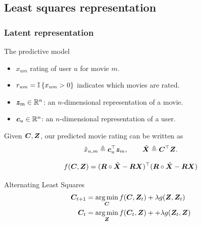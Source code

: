 \subsection{Least squares representation}
\begin{frame}
  \frametitle{Latent representation}
  \begin{block}{The predictive model}
    \begin{itemize}
    \item $x_{um}$ rating of user $u$ for movie $m$.
    \item $r_{um} = \mathop{\mbox{\ensuremath{\mathbb{I}}}}\left\{x_{um} > 0\right\}$ indicates which movies are rated.
    \item $\bz_{m} \in \Reals^n$: an $n$-dimensional representation of a movie.
    \item $\bc_{u} \in \Reals^n$: an $n$-dimensional representation of a user.
    \end{itemize}

    Given $\MC, \MZ$, our predicted movie rating can be written as
    \[
    \hat{x}_{u,m} \defn \bc_u^\top \bz_m, \qquad \hat{\MX} \defn \MC^\top \MZ.
    \]
  \end{block}
\[
f(\MC, \MZ) = (\MR \circ \hat{\MX} - \MR \MX)^\top (\MR \circ \hat{\MX} - \MR \MX)
\]
\begin{block}{Alternating Least Squares}
  \begin{align}
    \label{eq:als}
    \MC_{t+1} &= \argmin_{\MC} f(\MC, \MZ_t) + \lambda g(\MZ, \MZ_t)\\
    \MC_{t} &= \argmin_{\MZ} f(\MC_t, \MZ) +  + \lambda g(\MZ_t, \MZ)
  \end{align}
\end{block}
\end{frame}


